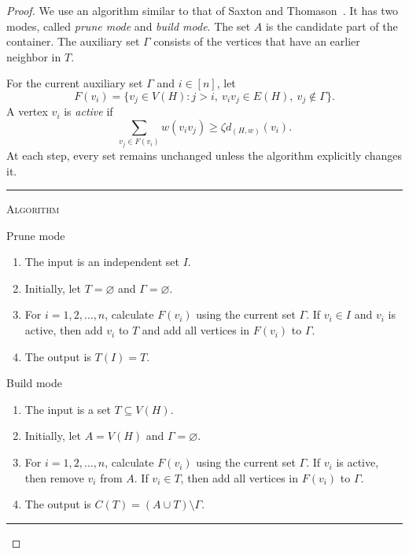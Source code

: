 \documentclass[12pt]{article}
\numberwithin{equation}{section}
\theoremstyle{definition}
\begin{document}
\begin{proof}
We use an algorithm similar to that of Saxton and Thomason~\cite{ST2015}. It has
two modes, called \emph{prune mode} and \emph{build mode}.
The set $A$ is the candidate part of the container. The auxiliary set $\Gamma$
consists of the vertices that have an earlier neighbor in $T$.

For the current auxiliary set $\Gamma$ and $i \in [n]$, let
\[
 F(v_i) = \{v_j \in V(H) : j > i,\ v_iv_j \in E(H),\ v_j \notin \Gamma\}.
\]
A vertex $v_i$ is \emph{active} if
\begin{equation}\label{eq:active-condition}
 \sum_{v_j \in F(v_i)} w(v_iv_j) \geq \zeta d_{(H,w)}(v_i).
\end{equation}
At each step, every set remains unchanged unless the algorithm explicitly
changes it.

\medskip
\noindent
\begin{minipage}{\textwidth}
\hrule
\smallskip
\noindent\textsc{Algorithm}
\par\smallskip
\noindent
\begin{minipage}[t]{0.48\textwidth}
\vspace{0pt}
\centering
Prune mode
\par\smallskip
\raggedright
\begin{enumerate}[leftmargin=1.5em,label=\arabic*.,itemsep=0.4em,topsep=0pt]
\item The input is an independent set $I$.
\item Initially, let $T = \varnothing$ and $\Gamma = \varnothing$.
\item For $i=1,2,\ldots,n$, calculate $F(v_i)$ using the current set $\Gamma$.
If $v_i \in I$ and $v_i$ is active, then add $v_i$ to $T$ and add all vertices
in $F(v_i)$ to $\Gamma$.
\item The output is $T(I) = T$.
\end{enumerate}
\end{minipage}
\hfill
\begin{minipage}[t]{0.48\textwidth}
\vspace{0pt}
\centering
Build mode
\par\smallskip
\raggedright
\begin{enumerate}[leftmargin=1.5em,label=\arabic*.,itemsep=0.4em,topsep=0pt]
\item The input is a set $T \subseteq V(H)$.
\item Initially, let $A = V(H)$ and $\Gamma = \varnothing$.
\item For $i=1,2,\ldots,n$, calculate $F(v_i)$ using the current set $\Gamma$.
If $v_i$ is active, then remove $v_i$ from $A$. If $v_i \in T$, then add all
vertices in $F(v_i)$ to $\Gamma$.
\item The output is $C(T) = (A \cup T) \setminus \Gamma$.
\end{enumerate}
\end{minipage}
\smallskip
\hrule
\end{minipage}
\medskip


\end{proof}
\end{document}
